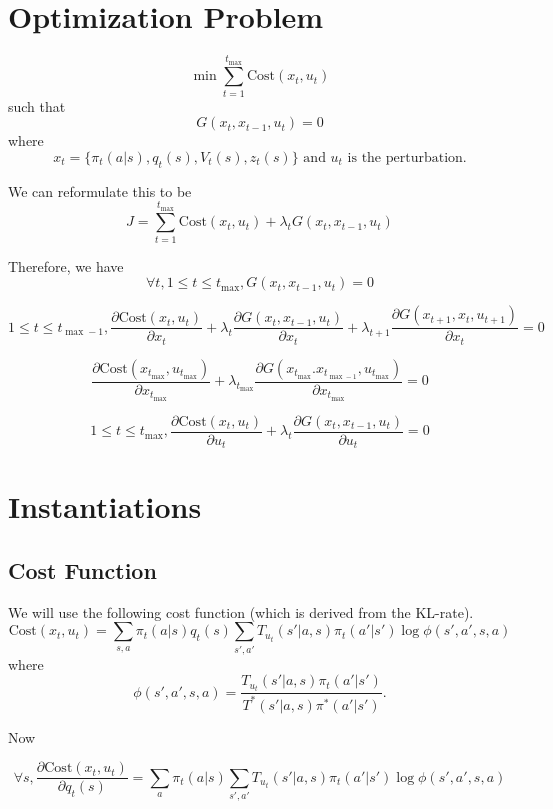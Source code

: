 \documentclass{article}
\newcommand{\ct}{\ensuremath{\mathrm{Cost}(x_t,u_t)}}
\newcommand{\cmax}{\ensuremath{\mathrm{Cost}(x_{t_{\max}},u_{t_{\max}})}}
\newcommand{\G}{\ensuremath{G(x_t,x_{t-1},u_t)}}
\newcommand{\Tu}{\ensuremath{T_{u_t}(s'|a,s)}}
\begin{document}
\section*{Optimization Problem}


\[
\min \sum_{t=1}^{t_{\max}} \ct
\]
such that
\[
G(x_t,x_{t-1},u_t)=0
\]
where
\[
x_t=\{\pi_t(a|s),q_t(s),V_{t}(s),z_t(s)\} \mbox{ and $u_t$ is the perturbation.}
\]

We can reformulate this to be
\[
J=\sum_{t=1}^{t_{\max}} \ct +\lambda_t \G
\]

Therefore, we have
\begin{equation}
\forall t, 1\leq t\leq t_{\max},   \G=0
\end{equation}

\begin{equation}\label{eq:general}
1\leq t\leq t_{\max-1}, \frac{\partial \ct}{\partial x_t}+
\lambda_t\frac{\partial \G}{\partial x_t}+
\lambda_{t+1}\frac{\partial G(x_{t+1},x_t,u_{t+1})}{\partial x_t}=0
\end{equation}

\begin{equation}\label{eq:tmax}
 \frac{\partial \cmax}{\partial x_{t_{\max}}}+\lambda_{t_{\max}}\frac{ \partial G(x_{t_{\max}} .x_{t_{\max-1}},u_{t_{\max}})} {\partial x_{t_{\max}} }=0
\end{equation}

\begin{equation}\label{eq:ut}
1\leq t\leq t_{\max}, \frac{\partial\ct}{\partial u_t}+\lambda_t \frac{\partial \G}{\partial u_t}=0
\end{equation}

\section*{Instantiations}
\subsection*{Cost Function}
We will use the following cost function (which is derived from the KL-rate).
\begin{equation}
\ct=\sum_{s,a}\pi_t(a|s)q_t(s)\sum_{s',a'} \Tu \pi_t(a'|s')\log \phi(s',a',s,a)
\end{equation}
where
\[
\phi(s',a',s,a)=\frac{\Tu \pi_t(a'|s')}{T^*(s'|a,s)\pi^*(a'|s')}.
\]

\noindent Now

\[
\forall s, \frac{\partial \ct}{\partial q_t(s)}=\sum_{a}\pi_t(a|s)\sum_{s',a'} \Tu \pi_t(a'|s')\log \phi(s',a',s,a)
\]
\end{document}
